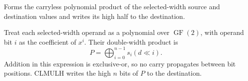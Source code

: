 Forms the carryless polynomial product of the selected-width source and destination values and writes its high half to the destination.


Treat each selected-width operand as a polynomial over \(\operatorname{GF}(2)\), with operand bit \(i\) as the coefficient of \(x^i\). Their double-width product is
\[
  P = \bigoplus_{i=0}^{n-1} s_i (d \ll i) .
\]
Addition in this expression is exclusive-or, so no carry propagates between bit positions. CLMULH writes the high \(n\) bits of \(P\) to the destination.
